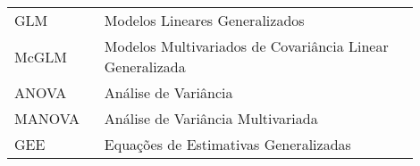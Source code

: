 

\begin{listaacron}

\begin{longtable}[l]{p{0.2\linewidth}p{0.7\linewidth}}

GLM & Modelos Lineares Generalizados\\
McGLM & Modelos Multivariados de Covariância Linear Generalizada\\
ANOVA & Análise de Variância\\
MANOVA & Análise de Variância Multivariada\\
GEE & Equações de Estimativas Generalizadas\\

\end{longtable}

\end{listaacron}

